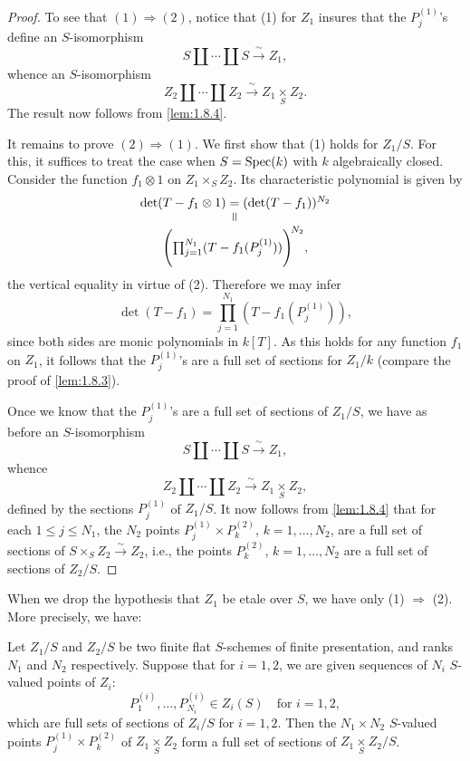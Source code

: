 \begin{proof}
To see that $(1) \Longrightarrow (2)$, notice that (1) for $Z_1$ insures that the $P_j^{(1)}$'s define an $S$-isomorphism
\[
S \amalg \cdots \amalg S \xrightarrow{\ \sim\ } Z_1,
\]
whence an $S$-isomorphism
\[
Z_2 \amalg \cdots \amalg Z_2 \xrightarrow{\ \sim\ } Z_1 \underset{S}{\times} Z_2.
\]
The result now follows from \ref{lem:1.8.4}.

It remains to prove $(2) \Longrightarrow (1)$. We first show that (1) holds for $Z_1/S$. For this, it suffices to treat the case when $S = \operatorname{Spec}(k)$ with $k$ algebraically closed. Consider the function $f_1 \otimes 1$ on $Z_1 \times_S Z_2$. Its characteristic polynomial is given by
\[
\begin{array}{c}
\det(T - f_1 \otimes 1) = (\det(T - f_1))^{N_2} \\
\rotatebox{90}{$=$} \\
\Biggl( \prod_{j=1}^{N_1} (T - f_1(P_j^{(1)})) \Biggr)^{\!N_2},
\end{array}
\]
the vertical equality in virtue of (2). Therefore we may infer
\[
\det(T - f_1) = \prod_{j=1}^{N_1} (T - f_1(P_j^{(1)})),
\]
since both sides are monic polynomials in $k[T]$. As this holds for any function $f_1$ on $Z_1$, it follows that the $P_j^{(1)}$'s are a full set of sections for $Z_1/k$ (compare the proof of \ref{lem:1.8.3}).

Once we know that the $P_j^{(1)}$'s are a full set of sections of $Z_1/S$, we have as before an $S$-isomorphism
\[
S \amalg \cdots \amalg S \xrightarrow{\ \sim\ } Z_1,
\]
whence
\[
Z_2 \amalg \cdots \amalg Z_2 \xrightarrow{\ \sim\ } Z_1 \underset{S}{\times} Z_2,
\]
defined by the sections $P_j^{(1)}$ of $Z_1/S$. It now follows from \ref{lem:1.8.4} that for each $1 \le j \le N_1$, the $N_2$ points $P_j^{(1)} \times P_k^{(2)}$, $k = 1, \dots, N_2$, are a full set of sections of $S \times_S Z_2 \xrightarrow{\sim} Z_2$, i.e., the points $P_k^{(2)}$, $k = 1, \dots, N_2$ are a full set of sections of $Z_2/S$.
\end{proof}

When we drop the hypothesis that $Z_1$ be etale over $S$, we have only (1) $\Longrightarrow$ (2). More precisely, we have:

\begin{lemma}\label{lem:1.8.6}
Let $Z_1/S$ and $Z_2/S$ be two finite flat $S$-schemes of finite presentation, and ranks $N_1$ and $N_2$ respectively. Suppose that for $i = 1, 2$, we are given sequences of $N_i$ $S$-valued points of $Z_i$:
\[
P_1^{(i)}, \dots, P_{N_i}^{(i)} \in Z_i(S) \quad \text{for } i = 1, 2,
\]
which are full sets of sections of $Z_i/S$ for $i = 1, 2$. Then the $N_1 \times N_2$ $S$-valued points $P_j^{(1)} \times P_k^{(2)}$ of $Z_1 \underset{S}{\times} Z_2$ form a full set of sections of $Z_1 \underset{S}{\times} Z_2/S$.
\end{lemma}

